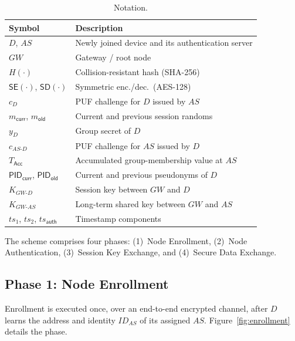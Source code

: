 \documentclass[conference]{IEEEtran}
\begin{document}
\begin{table}[!t]
  \centering
  \caption{Notation.}
  \label{tab:notations}
  \scriptsize
  \setlength{\tabcolsep}{4pt}
  \begin{tabular}{ll}
    \toprule
    Symbol & Description \\
    \midrule
    $D$, $AS$ & Newly joined device and its authentication server \\
    $GW$ & Gateway / root node \\
    $H(\cdot)$ & Collision-resistant hash (SHA-256) \\
    $\mathsf{SE}(\cdot)$, $\mathsf{SD}(\cdot)$ & Symmetric enc./dec.\ (AES-128) \\
    $c_D$ & PUF challenge for $D$ issued by $AS$ \\
    $m_\mathsf{curr}$, $m_\mathsf{old}$ & Current and previous session randoms \\
    $y_D$ & Group secret of $D$ \\
    $c_{AS\text{-}D}$ & PUF challenge for $AS$ issued by $D$ \\
    $T_\mathsf{Acc}$ & Accumulated group-membership value at $AS$ \\
    $\mathsf{PID}_\mathsf{curr}$, $\mathsf{PID}_\mathsf{old}$ & Current and previous pseudonyms of $D$ \\
    $K_{GW\text{-}D}$ & Session key between $GW$ and $D$ \\
    $K_{GW\text{-}AS}$ & Long-term shared key between $GW$ and $AS$ \\
    $ts_1$, $ts_2$, $ts_\mathsf{auth}$ & Timestamp components \\
    \bottomrule
  \end{tabular}
\end{table}

The scheme comprises four phases: (1)~Node Enrollment, (2)~Node
Authentication, (3)~Session Key Exchange, and (4)~Secure Data Exchange.

\subsection{Phase 1: Node Enrollment}

Enrollment is executed once, over an end-to-end encrypted channel, after $D$
learns the address and identity $ID_{AS}$ of its assigned $AS$.
Figure~\ref{fig:enrollment} details the phase.
\end{document}
